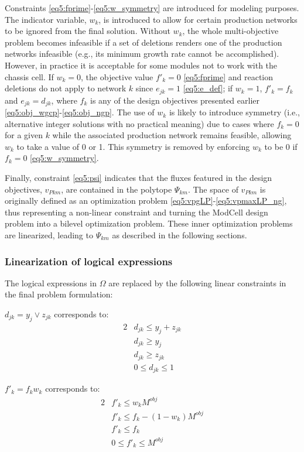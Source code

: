 Constraints \eqref{eq5:fprime}-\eqref{eq5:w_symmetry} are introduced for modeling purposes. The indicator variable, $w_k$, is introduced to allow for certain production networks to be ignored from the final solution. Without $w_k$, the whole multi-objective problem becomes infeasible if a set of deletions renders one of the production networks infeasible (e.g., its minimum growth rate cannot be accomplished). However, in practice it is acceptable for some modules not to work with the chassis cell.
If $w_k=0$, the objective value $f'_k=0$ \eqref{eq5:fprime} and reaction deletions do not apply to network $k$ since $e_{jk}=1$ \eqref{eq5:e_def}; if $w_k=1$, $f'_k = f_k$ and $e_{jk} = d_{jk}$, where $f_k$ is any of the design objectives presented earlier \eqref{eq5:obj_wgcp}-\eqref{eq5:obj_ngp}.
The use of $w_k$ is likely to introduce symmetry (i.e., alternative integer solutions with no practical meaning) due to cases where $f_k=0$ for a given $k$ while the associated production network remains feasible, allowing $w_k$ to take a value of 0 or 1. This symmetry is removed by enforcing $w_k$ to be 0 if $f_k=0$ \eqref{eq5:w_symmetry}.


Finally, constraint \eqref{eq5:psi} indicates that the fluxes featured in the design objectives, $v_{Pkm}$, are contained in the polytope $\Psi_{km}$. The space of $v_{Pkm}$ is originally defined as an optimization problem \eqref{eq5:vpgLP}-\eqref{eq5:vpmaxLP_ng}, thus representing a non-linear constraint and turning the ModCell design problem into a bilevel optimization problem. These inner optimization problems are linearized, leading to $\Psi_{km}$ as described in the following sections.

\subsubsection{Linearization of logical expressions}
The logical expressions in $\Omega$ are replaced by the following linear constraints in the final problem formulation:

\noindent $d_{jk} = y_j \lor z_{jk}$ corresponds to:
\begin{alignat}{2}
& d_{jk} \le y_j + z_{jk}  \label{eq5:d1}\\
& d_{jk} \ge y_j  \label{eq5:d2}\\
& d_{jk} \ge z_{jk} \label{eq5:d3}\\
&  0 \le d_{jk} \le 1  \label{eq5:d4}
\end{alignat}

\noindent $f'_k = f_k w_k$ corresponds to:
\begin{alignat}{2}
& f'_k \le w_k M^{obj}  \\
& f'_k \le f_k - (1-w_k) M^{obj}  \\
& f'_k \le f_k\\
& 0 \le f'_k \le M^{obj}
\end{alignat}

